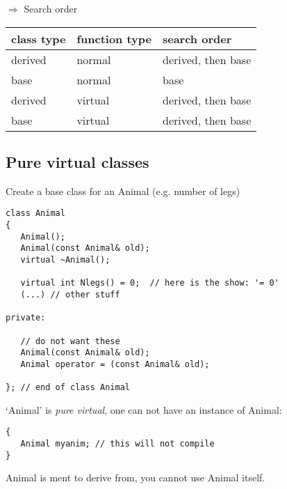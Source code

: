 $\Longrightarrow$ Search order\\
\begin{tabular}{|l|l|l|}
\hline
class type & function type & search order
\\ \hline\hline
derived & normal & derived, then base
\\ \hline
base & normal & base
\\ \hline
derived & virtual & derived, then base
\\ \hline
base & virtual & derived, then base
\\ \hline
\end{tabular}

\subsection{Pure virtual classes}
Create a base class for an Animal (e.g. number of legs)\\
\begin{boxedminipage}{\linewidth}
\begin{verbatim}
class Animal
{
   Animal();
   Animal(const Animal& old);
   virtual ~Animal();

   virtual int Nlegs() = 0;  // here is the show: '= 0'
   (...) // other stuff

private:

   // do not want these
   Animal(const Animal& old);
   Animal operator = (const Animal& old);
   
}; // end of class Animal
\end{verbatim}
\end{boxedminipage}
`Animal' is \emph{pure virtual}, one can not have an instance of Animal:\\
\begin{boxedminipage}{\linewidth}
\begin{verbatim}
{
   Animal myanim; // this will not compile
}
\end{verbatim}
\end{boxedminipage}
Animal is ment to derive from, you cannot use Animal itself.

